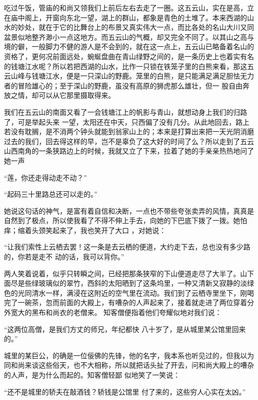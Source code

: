 \documentclass{article}
\begin{document}
吃过午饭，管庙的和尚又领我们上前后左右去走了一圈。这五云山，实在是高，立在庙中阁上，开窗向东北一望，湖上的群山，都象是青色的土堆了。本来西湖的山水的妙处，就在于它的比舞台上的布景又真实伟大一点，而比各处的名山大川又同盆景似地整齐渺小一点这地方。而五云山的气概，却又完全不同了。以其山之高与境的僻，一般脚力不健的游人是不会到的，就在这一点上，五云山已略备着名山的资格了，更何况前面远处，蜿蜒盘曲在青山绿野之间的，是一条历史上也着实有名的钱塘江水呢？所以若把西湖的山水，比作一只锁在铁笼子里的白熊来看，那这五云山峰与钱塘江水，便是一只深山的野鹿。笼里的白熊，是只能满足满足胆怯无力者的冒险雄心的；至于深山的野鹿，虽没有高原的狮虎那么雄壮，但一
股自由奔放之情，却可以从它那里摄取得来。 

我们在五云山的南面又看了一会钱塘江上的帆影与青山，就想动身上我们的归路了，可是举起头来
\newpage
一望，太阳还在中天，只西偏了没有几分。从此地回去，路上若没有耽搁，是不消两个钟头就能到翁家山上的；本来是打算出来把一天光阴消磨过去的我们，回去得这样的早，岂不是辜负了这大好的时间了么？所以走到了五云山西南角的一条狭路边上的时候，我就又立了下来，拉着了她的手亲亲热热地问了她一声


“莲，你还走得动走不动？” 


“起码三十里路总还可以走的。” 

她说这句话的神气，是富有着自信和决断，一点也不带些夸张卖弄的风情，真真是自然到了极点，所以使我看了不得不伸上手去，向她的下巴底下拨了一拨。她怕痒；缩着头颈笑起来了，我也笑开了大口
，对她说： 

“让我们索性上云栖去罢！这一条是去云栖的便道，大约走下去，总也没有多少路的，你若是走不
动的话，我可以背你。” 

\newpage

两人笑着说着，似乎只转瞬之间，已经把那条狭窄的下山便道走尽了大半了。山下面尽是些绿玻璃似的翠竹，西斜的太阳晒到了这条坞里，一种又清新又寂静的淡绿色的光同清水一样，满浸在这附近的空气里在流动。我们到了云栖寺里坐下，刚喝完了一碗茶，忽而前面的大殿上，有嘈杂的人声起来了，接着就走进了两位穿着分外宽大的黑布和尚衣的老僧来。
知客僧便指着他们夸耀似地对我们说： 

“这两位高僧，是我们方丈的师兄，年纪都快
八十岁了，是从城里某公馆里回来的。” 

城里的某巨公，的确是一位佞佛的先锋，他的名字，我本系也听见过的，但我以为同和尚来谈这些俗天，也不大相称，所以就把话头扯了开去，问和尚大殿上的嘈杂的人声，是为什么而起的。知客僧轻鄙
似地笑了一笑说： 

“还不是城里的轿夫在敲酒钱？轿钱是公馆里
付了来的，这些穷人心实在太凶。” 

\newpage
\end{document}

